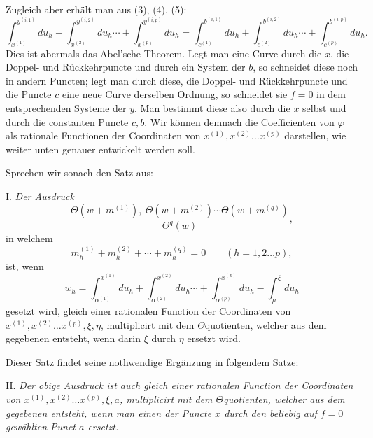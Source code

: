 \documentclass[10pt]{article}
\begin{document}
Zugleich aber erhält man aus (3), (4), (5):
\[
\int_{x^{(1)}}^{y^{(i,1)}}du_h+\int_{x^{(2)}}^{y^{(i,2)}}du_h\cdots+
\int_{x^{(p)}}^{y^{(i,p)}}du_h
=
\int_{c^{(1)}}^{b^{(i,1)}}du_h+\int_{c^{(2)}}^{b^{(i,2)}}du_h\cdots+
\int_{c^{(p)}}^{b^{(i,p)}}du_h.
\]
Dies ist abermals das Abel'sche Theorem. Legt man eine Curve durch die \(x\), die Doppel- und Rückkehrpuncte und durch ein System der \(b\), so schneidet diese noch in andern Puncten; legt man durch diese, die Doppel- und Rückkehrpuncte und die Puncte \(c\) eine neue Curve derselben Ordnung, so schneidet sie \(f=0\) in dem entsprechenden Systeme der \(y\). Man bestimmt diese also durch die \(x\) selbst und durch die constanten Puncte \(c,b\). Wir können demnach die Coefficienten von \(\varphi\) als rationale Functionen der Coordinaten von \(x^{(1)},x^{(2)}\ldots x^{(p)}\) darstellen, wie weiter unten genauer entwickelt werden soll.

Sprechen wir sonach den Satz aus:

\medskip
\noindent I. \emph{Der Ausdruck}
\[
\frac{\Theta(w+m^{(1)}),\ \Theta(w+m^{(2)})\cdots\Theta(w+m^{(q)})}{\Theta^{q}(w)},
\]
in welchem
\[
m_h^{(1)}+m_h^{(2)}+\cdots+m_h^{(q)}=0\qquad(h=1,2\ldots p),
\]
ist, wenn
\[
w_h=\int_{\alpha^{(1)}}^{x^{(1)}}du_h+
\int_{\alpha^{(2)}}^{x^{(2)}}du_h\cdots+
\int_{\alpha^{(p)}}^{x^{(p)}}du_h-
\int_{\mu}^{\xi}du_h
\]
gesetzt wird, gleich einer rationalen Function der Coordinaten von \(x^{(1)},x^{(2)}\ldots x^{(p)},\xi,\eta\), multiplicirt mit dem \(\Theta\)quotienten, welcher aus dem gegebenen entsteht, wenn darin \(\xi\) durch \(\eta\) ersetzt wird.

Dieser Satz findet seine nothwendige Ergänzung in folgendem Satze:

\medskip
\noindent II. \emph{Der obige Ausdruck ist auch gleich einer rationalen Function der Coordinaten von \(x^{(1)},x^{(2)}\ldots x^{(p)},\xi,a\), multiplicirt mit dem \(\Theta\)quotienten, welcher aus dem gegebenen entsteht, wenn man einen der Puncte \(x\) durch den beliebig auf \(f=0\) gewählten Punct \(a\) ersetzt.}
\end{document}
